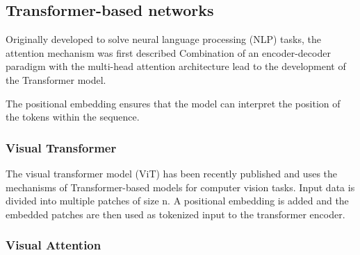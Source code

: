 \subsection{Transformer-based networks}

Originally developed to solve neural language processing (NLP) tasks, the attention mechanism was first described \cite{vaswani_attention_2023}
Combination of an encoder-decoder paradigm with the multi-head attention architecture lead to the development of the Transformer model.


The positional embedding ensures that the model can interpret the position of the tokens within the sequence.



\subsubsection{Visual Transformer}

The visual transformer model (ViT) has been recently published \cite{dosovitskiy_image_2021} and uses the mechanisms of Transformer-based models for computer vision tasks. Input data is divided into multiple patches of size n. A positional embedding is added and the embedded patches are then used as tokenized input to the transformer encoder. 


\subsubsection{Visual Attention}